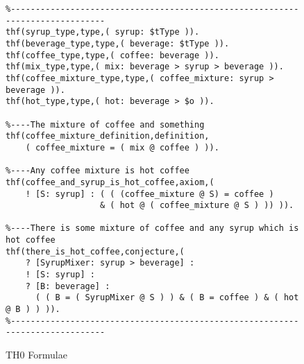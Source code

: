 \documentclass{easychair}
\begin{document}
\begin{figure}[htbp]
\begin{small}
\begin{verbatim}
%------------------------------------------------------------------------------
thf(syrup_type,type,( syrup: $tType )).
thf(beverage_type,type,( beverage: $tType )).
thf(coffee_type,type,( coffee: beverage )).
thf(mix_type,type,( mix: beverage > syrup > beverage )).
thf(coffee_mixture_type,type,( coffee_mixture: syrup > beverage )).
thf(hot_type,type,( hot: beverage > $o )).

%----The mixture of coffee and something
thf(coffee_mixture_definition,definition,
    ( coffee_mixture = ( mix @ coffee ) )).

%----Any coffee mixture is hot coffee
thf(coffee_and_syrup_is_hot_coffee,axiom,(
    ! [S: syrup] : ( ( (coffee_mixture @ S) = coffee )
                   & ( hot @ ( coffee_mixture @ S ) )) )).

%----There is some mixture of coffee and any syrup which is hot coffee
thf(there_is_hot_coffee,conjecture,(
    ? [SyrupMixer: syrup > beverage] :
    ! [S: syrup] :
    ? [B: beverage] :
      ( ( B = ( SyrupMixer @ S ) ) & ( B = coffee ) & ( hot @ B ) ) )).
%------------------------------------------------------------------------------
\end{verbatim}
\end{small}
\caption{TH0 Formulae}
\label{TH0Example}
\end{figure}
\end{document}
